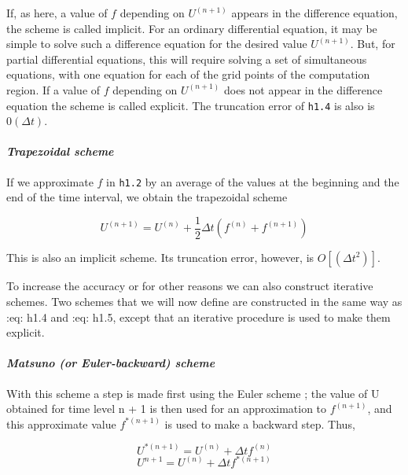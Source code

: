 If, as here, a value of \(f\) depending on \(U^{\left( n + 1 \right)}\)
appears in the difference equation, the scheme is called implicit. For
an ordinary differential equation, it may be simple to solve such a
difference equation for the desired value \(U^{\left( n + 1 \right)}\).
But, for partial differential equations, this will require solving a set
of simultaneous equations, with one equation for each of the grid points
of the computation region. If a value of \(f\) depending on
\(U^{\left( n + 1 \right)}\) does not appear in the difference equation
the scheme is called explicit. The truncation error of \texttt{h1.4} is
also is \(0\left( \Delta t \right)\).

\paragraph{\texorpdfstring{\emph{Trapezoidal
scheme}}{Trapezoidal scheme}}\label{trapezoidal-scheme}

If we approximate \(f\) in \texttt{h1.2} by an average of the values at
the beginning and the end of the time interval, we obtain the
trapezoidal scheme

\[U^{( n + 1 )} = U^{( n )} + \frac{1}{2}\Delta t\left( f^{( n )} + f^{( n + 1 )} \right)\]

This is also an implicit scheme. Its truncation error, however, is
\(O\left[ \left( {\Delta t}^{2} \right) \right]\).

To increase the accuracy or for other reasons we can also construct
iterative schemes. Two schemes that we will now define are constructed
in the same way as :eq: {h1.4} and :eq: {h1.5}, except that an iterative
procedure is used to make them explicit.

\paragraph{\texorpdfstring{\emph{Matsuno (or Euler-backward)
    scheme}}{Matsuno (or Euler-backward) scheme}}\label{matsuno-or-euler-backward-scheme}

With this scheme a step is made first using the Euler scheme ; the value
of U obtained for time level n + 1 is then used for an approximation to
\(f^{\left( n + 1 \right)}\), and this approximate value
\(f^{*\left( n + 1 \right)}\) is used to make a backward step. Thus,

\[U^{*\left( n + 1 \right)} = U^{\left( n \right)} + \Delta t  f^{\left( n \right)}\]\[U^{n + 1} = U^{\left( n \right)} + \Delta t  {f^{*\left( n + 1 \right)}}\]

